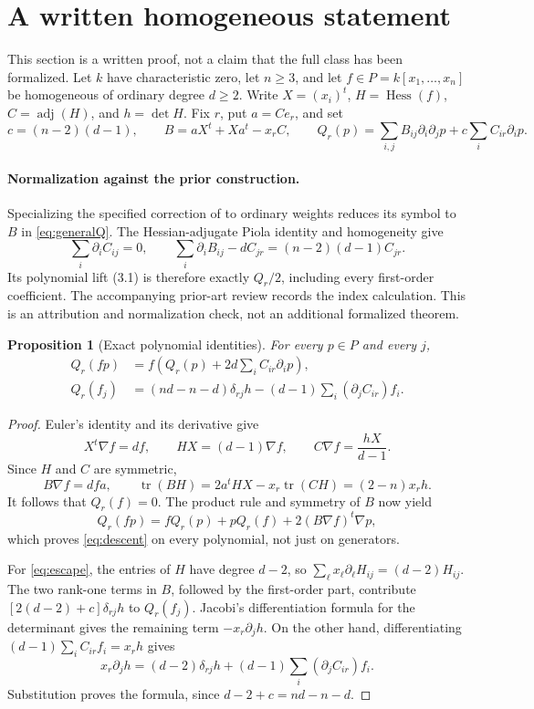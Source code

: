 \documentclass[11pt,letterpaper]{article}
\newtheorem{proposition}[theorem]{Proposition}
\theoremstyle{remark}\newtheorem{remark}[theorem]{Remark}
\DeclareMathOperator{\Hess}{Hess}
\DeclareMathOperator{\adj}{adj}
\DeclareMathOperator{\tr}{tr}
\begin{document}
\section{A written homogeneous statement}\label{sec:general}
This section is a written proof, not a claim that the full class has been
formalized. Let \(k\) have characteristic zero, let \(n\ge3\), and let
\(f\in P=k[x_1,\ldots,x_n]\) be homogeneous of ordinary degree \(d\ge2\).
Write \(X=(x_i)^t\), \(H=\Hess(f)\), \(C=\adj(H)\), and \(h=\det H\).
Fix \(r\), put \(a=Ce_r\), and set
\begin{equation}\label{eq:generalQ}
 c=(n-2)(d-1),\qquad B=aX^t+Xa^t-x_rC,
 \qquad Q_r(p)=\sum_{i,j}B_{ij}\partial_i\partial_jp+c\sum_iC_{ir}\partial_ip.
\end{equation}

\paragraph{Normalization against the prior construction.}
Specializing the specified correction of \cite{YZZ} to ordinary weights
reduces its symbol to $B$ in \eqref{eq:generalQ}. The Hessian-adjugate
Piola identity and homogeneity give
\[
 \sum_i\partial_iC_{ij}=0,\qquad
 \sum_i\partial_iB_{ij}-dC_{jr}=(n-2)(d-1)C_{jr}.
\]
Its polynomial lift (3.1) is therefore exactly $Q_r/2$, including every
first-order coefficient. The accompanying prior-art review records the
index calculation. This is an attribution and normalization check, not an
additional formalized theorem.

\begin{proposition}[Exact polynomial identities]\label{prop:identities}
For every \(p\in P\) and every \(j\),
\begin{align}
 Q_r(fp)&=f\left(Q_r(p)+2d\sum_i C_{ir}\partial_ip\right),\label{eq:descent}\\
 Q_r(f_j)&=(nd-n-d)\delta_{rj}h
       -(d-1)\sum_i(\partial_jC_{ir})f_i.\label{eq:escape}
\end{align}
\end{proposition}
\begin{proof}
Euler's identity and its derivative give
\[
 X^t\nabla f=df,\qquad HX=(d-1)\nabla f,
 \qquad C\nabla f=\frac{hX}{d-1}.
\]
Since \(H\) and \(C\) are symmetric,
\[
 B\nabla f=dfa,\qquad
 \tr(BH)=2a^tHX-x_r\tr(CH)=(2-n)x_rh.
\]
It follows that \(Q_r(f)=0\). The product rule and symmetry of \(B\) now yield
\[
 Q_r(fp)=fQ_r(p)+pQ_r(f)+2(B\nabla f)^t\nabla p,
\]
which proves \eqref{eq:descent} on every polynomial, not just on generators.

For \eqref{eq:escape}, the entries of \(H\) have degree \(d-2\), so
\(\sum_\ell x_\ell\partial_\ell H_{ij}=(d-2)H_{ij}\).
The two rank-one terms in \(B\), followed by the first-order part, contribute
\([2(d-2)+c]\delta_{rj}h\) to \(Q_r(f_j)\).
Jacobi's differentiation formula for the determinant gives the remaining term
\(-x_r\partial_jh\). On the other hand, differentiating
\((d-1)\sum_iC_{ir}f_i=x_rh\) gives
\[
 x_r\partial_jh=(d-2)\delta_{rj}h
       +(d-1)\sum_i(\partial_jC_{ir})f_i.
\]
Substitution proves the formula, since \(d-2+c=nd-n-d\).
\end{proof}
\end{document}
